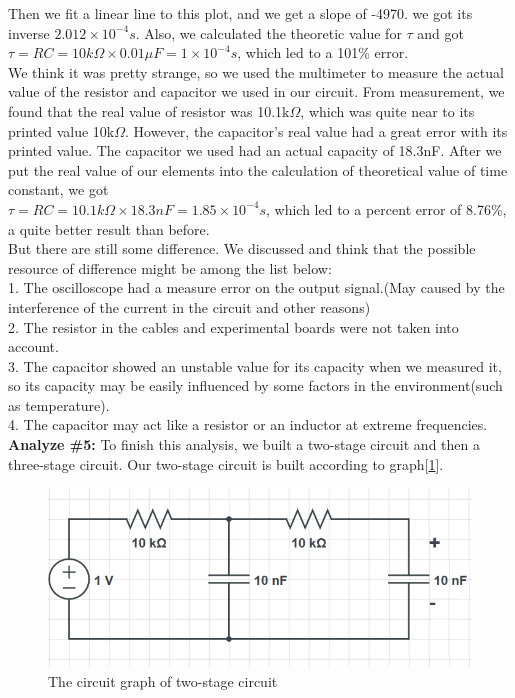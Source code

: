 \phantom{ } Then we fit a linear line to this plot, and we get a slope of -4970.
we got its inverse $2.012\times10^{-4}s$. Also, we calculated the theoretic value for $\tau$ and got 
$\tau = RC = 10k\Omega \times 0.01\mu F = 1\times10^{-4}s$, which led to a 101\% error.\\
We think it was pretty strange, so we used the multimeter to measure the actual value of the resistor and capacitor we used in our circuit. From measurement, we found that the real value of resistor was 10.1k$\Omega$, which was quite near to its printed value 10k$\Omega$. However, the capacitor's real value had a great error with its printed value. The capacitor we used had an actual capacity of 18.3nF. After we put the real value of our elements into the calculation of theoretical value of time constant, we got \\
$\tau = RC = 10.1k\Omega \times 18.3 nF = 1.85\times10^{-4}s$, which led to a percent error of 8.76\%, a quite better result than before.\\
But there are still some difference. We discussed and think that the possible resource of difference might be among the list below:\\
1. The oscilloscope had a measure error on the output signal.(May caused by the interference of the current in the circuit and other reasons)\\
2. The resistor in the cables and experimental boards were not taken into account.\\
3. The capacitor showed an unstable value for its capacity when we measured it, so its capacity may be easily influenced by some factors in the environment(such as temperature).\\
4. The capacitor may act like a resistor or an inductor at extreme frequencies.\\
\textbf{Analyze \#5:} \newline
\phantom{ } To finish this analysis, we built a two-stage circuit and then a three-stage circuit. Our two-stage circuit is built according to graph[\ref{fig:2.3}].\\

\begin{figure}[!htbp]
	\centering %
	\includegraphics[width=\linewidth]{images/2_3.PNG} %
	\caption{The circuit graph of two-stage circuit} %
	\label{fig:2.3} %
\end{figure}

